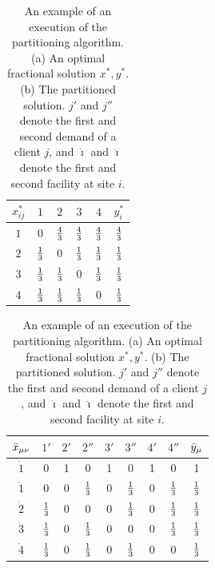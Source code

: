 \documentclass[oneside,final]{ucr}
\def\dsp{\def\baselinestretch{2.0}\large\normalsize}
\def\ssp{\def\baselinestretch{1.0}\large\normalsize}
\begin{document}
{
\begin{table}[ht]
%
\hfill
\begin{subtable}[b]{0.2\textwidth}
  \centering
  \begin{tabular}{c | c c c c | c }
    $x_{ij}^\ast$ & $1$ & $2$ & $3$ & $4$ & $y_{i}^\ast$\\
    \hline
    $1$ & 0 & ${\mbox{$\frac{4}{3}$}}$ & ${\mbox{$\frac{4}{3}$}}$ & ${\mbox{$\frac{4}{3}$}}$ & ${\mbox{$\frac{4}{3}$}}$ \\
    $2$ & ${\mbox{$\frac{1}{3}$}}$ & 0 & ${\mbox{$\frac{1}{3}$}}$ & ${\mbox{$\frac{1}{3}$}}$ & ${\mbox{$\frac{1}{3}$}}$ \\
    $3$ & ${\mbox{$\frac{1}{3}$}}$ & ${\mbox{$\frac{1}{3}$}}$ & 0 & ${\mbox{$\frac{1}{3}$}}$ & ${\mbox{$\frac{1}{3}$}}$ \\
    $4$ & ${\mbox{$\frac{1}{3}$}}$ & ${\mbox{$\frac{1}{3}$}}$ & ${\mbox{$\frac{1}{3}$}}$ & 0 & ${\mbox{$\frac{1}{3}$}}$ \\
  \end{tabular}
  \subcaption{}
  \label{tbl:example_opt}
\end{subtable}
%
\hspace{0.8in}
%
\begin{subtable}[b]{0.4\textwidth}
  \centering
  \begin{tabular}{c | c c c c c c c | c} %
    ${\bar x}_{\mu\nu}$ & $1'$ & $2'$ & $2''$ & $3'$ & $3''$ & $4'$ & $4''$ & ${\bar y}_{\mu}$ \\
    \hline
    $\dot{1}$ & 0 & 1 & 0 & 1 & 0 & 1 & 0 & 1\\
    $\ddot{1}$ & 0 & 0 & ${\mbox{$\frac{1}{3}$}}$ & 0 & ${\mbox{$\frac{1}{3}$}}$ & 0 & ${\mbox{$\frac{1}{3}$}}$ & ${\mbox{$\frac{1}{3}$}}$ \\
    $\dot{2}$ & ${\mbox{$\frac{1}{3}$}}$ & 0 & 0 & 0 & ${\mbox{$\frac{1}{3}$}}$ & 0 & ${\mbox{$\frac{1}{3}$}}$  & ${\mbox{$\frac{1}{3}$}}$ \\
    $\dot{3}$ & ${\mbox{$\frac{1}{3}$}}$ & 0 & ${\mbox{$\frac{1}{3}$}}$ & 0 & 0 & 0 & ${\mbox{$\frac{1}{3}$}}$  & ${\mbox{$\frac{1}{3}$}}$ \\
    $\dot{4}$ & ${\mbox{$\frac{1}{3}$}}$ & 0 & ${\mbox{$\frac{1}{3}$}}$ & 0 & ${\mbox{$\frac{1}{3}$}}$ & 0 & 0 & ${\mbox{$\frac{1}{3}$}}$ \\
  \end{tabular}
  \subcaption{}
  \label{tbl:example_part}
\end{subtable}
\hfill{\ }
%

\ssp
\caption[An example of an execution of the partitioning algorithm.]{
  An example of an execution of the partitioning algorithm.
  (a) An optimal fractional solution $x^\ast,y^\ast$.
  (b) The partitioned solution. $j'$ and $j''$ denote the first and second demand of a client $j$, 
	and $\dot{\imath}$ and $\ddot{\imath}$ denote the
        first and second facility at site $i$.}
\dsp
%
\end{table}
}
\end{document}
